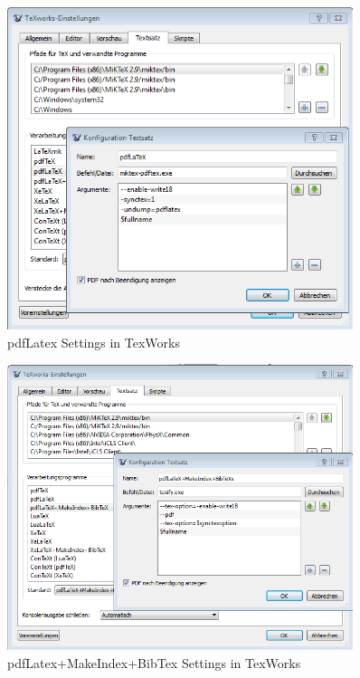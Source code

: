\begin{figure}[ht]
   \centering
   \includegraphics[width=0.9\textwidth]{img/pdfLatexSettingsForTexWorks.PNG}
   \caption{pdfLatex Settings in TexWorks}
   \label{img:pdfTexWorks}
\end{figure}

\begin{figure}[ht]
   \centering
   \includegraphics[width=0.9\textwidth]{img/pdfLatexMakeIndexBibTexSettingsForTexWorks.PNG}
   \caption{pdfLatex+MakeIndex+BibTex Settings in TexWorks}
   \label{img:pdfTexWorks2}
\end{figure}